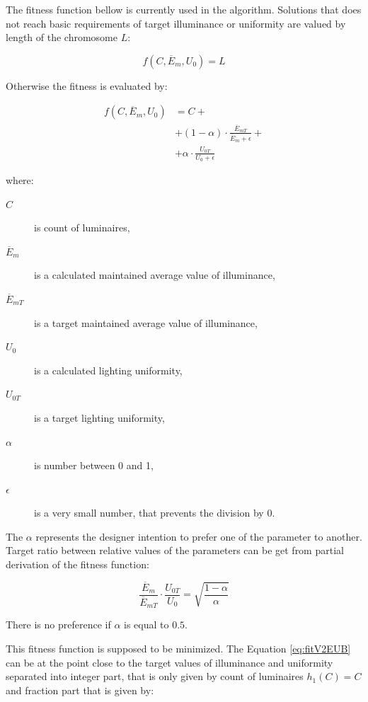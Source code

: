The fitness function bellow is currently used in the algorithm. Solutions that does not reach basic requirements of target illuminance or uniformity are valued by length of the chromosome $L$:

\begin{equation}
\label{eq:fitV2EUA}
	f\left(C,\overline{E}_{m}, U_0\right)= L
\end{equation}

Otherwise the fitness is evaluated by:

\begin{equation}
\label{eq:fitV2EUB}
\begin{split}
f\left(C, \overline{E}_{m}, U_0\right)&=C +\\
& + \left( 1 - \alpha\right)\cdot\frac{\overline{E}_{mT}}{\overline{E}_{m}+\epsilon} + \\
& + \alpha\cdot\frac{U_{0T}}{U_0 + \epsilon}
\end{split}
\end{equation}

\noindent where:
\begin{description}
	\item[$C$] is count of luminaires,
	\item[$\overline{E}_{m}$] is a calculated maintained average value of illuminance,
	\item[$\overline{E}_{mT}$] is a target maintained average value of illuminance,
	\item[$U_0$] is a calculated lighting uniformity,
	\item[$U_{0T}$] is a target lighting uniformity,
	\item[$\alpha$] is number between 0 and 1,
	\item[$\epsilon$] is a very small number, that prevents the division by 0.
\end{description}

The $\alpha$ represents the designer intention to prefer one of the parameter to another. Target ratio between relative values of the parameters can be get from partial derivation of the fitness function:

\begin{equation}
\label{eq:fitV2ratio}
\frac{\overline{E}_{m}}{\overline{E}_{mT}}\cdot\frac{U_{0T}}{U_0}=\sqrt{\frac{1-\alpha}{\alpha}}
\end{equation}

\noindent There is no preference if $\alpha$ is equal to $0.5$.

This fitness function is supposed to be minimized. The Equation \ref{eq:fitV2EUB} can be at the point close to the target values of illuminance and uniformity separated into integer part, that is only given by count of luminaires $h_1\left(C\right)= C$ and fraction part that is given by:

